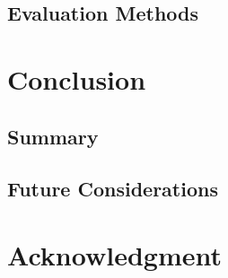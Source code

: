 \documentclass{ieeeojies}
\begin{document}
\subsection{Evaluation Methods}

\section{Conclusion}

\subsection{Summary}

\subsection{Future Considerations}

\section*{Acknowledgment}
\end{document}
